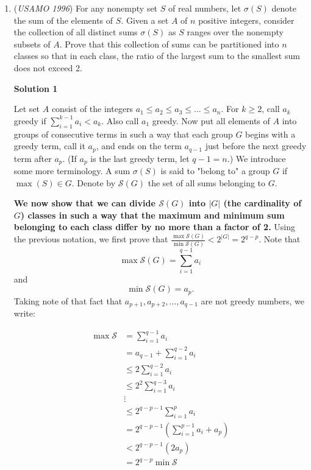 \begin{enumerate}
	\item (\textit{USAMO 1996}) For any nonempty set $S$ of real numbers, let $\sigma(S)$ denote the sum of the elements of $S$. Given a set $A$ of $n$ positive integers, consider the collection of all distinct sums $\sigma(S)$ as $S$ ranges over the nonempty subsets of $A$.  Prove that this collection of sums can be partitioned into $n$ classes so that in each class, the ratio of the largest sum to the smallest sum does not exceed 2.


 



\textbf{Solution 1}

Let set $A$ consist of the integers $a_1\le a_2\le a_3\le\dots\le a_n$. For $k\ge 2$, call $a_k$ greedy if $\sum_{i=1}^{k-1}a_i < a_k$. Also call $a_1$ greedy. Now put all elements of $A$ into groups of consecutive terms in such a way that each group $G$ begins with a greedy term, call it $a_p$, and ends on the term $a_{q-1}$ just before the next greedy term after $a_p$. (If $a_p$ is the last greedy term, let $q-1=n$.) We introduce some more terminology. A sum $\sigma(S)$ is said to "belong to" a group $G$ if $\max(S)\in G$. Denote by $\mathcal{S}(G)$ the set of all sums belonging to $G$.

 \textbf{We now show that we can divide $\mathcal{S}(G)$ into $|G|$ (the cardinality of $G$) classes in such a way that the maximum and minimum sum belonging to each class differ by no more than a factor of 2.} Using the previous notation, we first prove that $\frac{\max{\mathcal{S}(G)}}{\min{\mathcal{S}(G)}}< 2^{|G|}=2^{q-p}$. Note that 
 \[\max{\mathcal{S}(G)}=\sum_{i=1}^{q-1}a_i\] and 
 \[\min{\mathcal{S}(G)}=a_p.\] Taking note of that fact that $a_{p+1},a_{p+2},\dots,a_{q-1}$ are not greedy numbers, we write:

 
 \begin{align*} \max{\mathcal{S}}&=\sum_{i=1}^{q-1}a_i \\ &=a_{q-1}+\sum_{i=1}^{q-2}a_i \\ &\le 2\sum_{i=1}^{q-2}a_i\\ &\le 2^2\sum_{i=1}^{q-3}a_i\\ &\vdots\\ &\le 2^{q-p-1}\sum_{i=1}^{p}a_i\\ &= 2^{q-p-1}(\sum_{i=1}^{p-1}a_i + a_p)\\ &<2^{q-p-1}(2a_p)\\ &=2^{q-p}\min\mathcal{S} \end{align*}



\end{enumerate}
